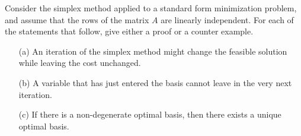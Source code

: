 Consider the simplex method applied to a standard form minimization problem, and assume that the rows of the matrix $A$ are linearly independent. For each of the statements that follow, give either a proof or a counter example.
\begin{itemize}
\item[(a)] An iteration of the simplex method might change the feasible solution while leaving the cost unchanged.
\item[(b)] A variable that has just entered the basis cannot leave in the very next iteration.
\item[(c)] If there is a non-degenerate optimal basis, then there exists a unique optimal basis.
\end{itemize}